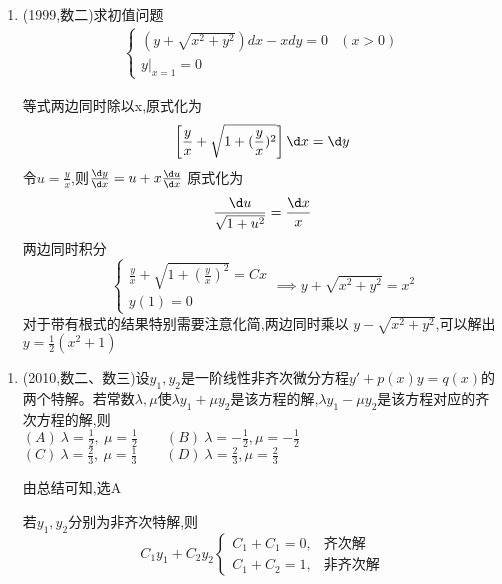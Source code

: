 \documentclass[12pt, a4paper, oneside, UTF8]{ctexbook}
\begin{document}
\begin{enumerate}[label=\arabic*.,start=3]
    \item (1999,数二)求初值问题
    \begin{align*}
        \begin{cases}
            (y+\sqrt{x^2+y^2})dx-xdy=0 & (x>0) \\
            y|_{x=1}=0
        \end{cases}
    \end{align*}
    
    \begin{solution}
    等式两边同时除以x,原式化为
    $$
    \left[\frac{y}{x}+\sqrt{1+(\frac{y}{x})^2}\right]\d x = \d y 
    $$
    令$u=\frac{y}{x}$,则$\frac{\d y}{\d x} = u + x\frac{\d u}{\d x}$ 原式化为
    $$
    \frac{\d u}{\sqrt{1+u^2}} = \frac{\d x}{x}
    $$
    两边同时积分
    $$
    \begin{cases}
        \displaystyle\frac{y}{x}+\sqrt{1+(\frac{y}{x})^2}=Cx \\
        \displaystyle y(1) = 0
    \end{cases} \implies y + \sqrt{x^2+y^2}=x^2
    $$
    {\color{red} 对于带有根式的结果特别需要注意化简,两边同时乘以 $y - \sqrt{x^2+y^2}$,可以解出$y=\frac{1}{2}(x^2+1)$}
    \end{solution}
\end{enumerate}



\begin{enumerate}[label=\arabic*.,start=4]
    \item (2010,数二、数三)设$y_1,y_2$是一阶线性非齐次微分方程$y'+p(x)y=q(x)$的两个特解。若常数$\lambda,\mu$使$\lambda y_1+\mu y_2$是该方程的解,$\lambda y_1-\mu y_2$是该方程对应的齐次方程的解,则 \\
    $(A)\ \lambda=\frac{1}{2},\ \mu=\frac{1}{2} \qquad (B)\ \lambda=-\frac{1}{2},\mu=-\frac{1}{2}$ \\
    $(C)\ \lambda=\frac{2}{3},\ \mu=\frac{1}{3}\qquad (D)\ \lambda=\frac{2}{3},\mu=\frac{2}{3}$ 

    
    \begin{solution}
    由总结可知,选A
    \end{solution}

    \begin{tcolorbox}[title={一阶,二阶线性微分方程(组)解的性质}]
    若$y_1,y_2$分别为非齐次特解,则
    $$
    C_1y_1+C_2y_2 \begin{cases}
        C_1 + C_1 = 0, & \text{齐次解} \\
        C_1 + C_2 = 1, & \text{非齐次解}
    \end{cases}
    $$
    \end{tcolorbox}
\end{enumerate}
\end{document}
